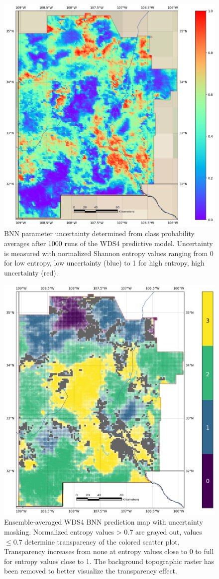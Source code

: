 \begin{figure}
\centering
\includegraphics[width=.75\textwidth]{templates/images/Figure-BNN_Entropy_Map.png}
\caption[Bayesian neural network parameter uncertainty map]
{BNN parameter uncertainty determined from class probability averages after 1000 runs of the WDS4 predictive model. Uncertainty is measured with normalized Shannon entropy values ranging from 0 for low entropy, low uncertainty (blue) to 1 for high entropy, high uncertainty (red).}
\label{fig:bnn_entropy_map}
\end{figure}

\begin{figure}
\centering
\includegraphics[width=.75\textwidth]{templates/images/Figure-BNN_All_Gradient_Map_Masked_whitebackground.png}
\caption[Parameter uncertainty mask on prediction map]
{Ensemble-averaged WDS4 BNN prediction map with uncertainty masking. Normalized entropy values > 0.7 are grayed out, values $\leq0.7$ determine transparency of the colored scatter plot. Transparency increases from none at entropy values close to 0 to full for entropy values close to 1. The background topographic raster has been removed to better visualize the transparency effect.}
\label{fig:bnn_masked_pred_map}
\end{figure}


